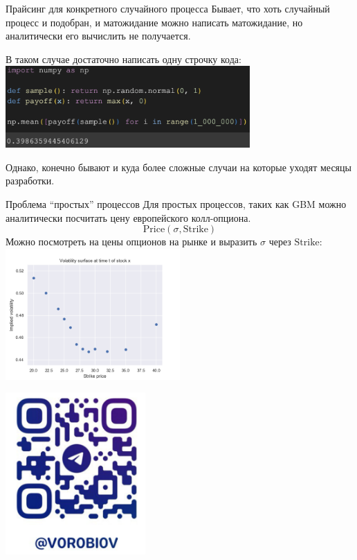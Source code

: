 \documentclass{beamer}
\newcommand{\quotes}[1]{``#1''}
\begin{document}
    \begin{frame}{Прайсинг для конкретного случайного процесса}
        Бывает, что хоть случайный процесс и подобран, и матожидание можно написать матожидание, но аналитически его вычислить не получается.

        В таком случае достаточно написать одну строчку кода:
        \includegraphics[width=0.7\textwidth]{code.png}

        Однако, конечно бывают и куда более сложные случаи на которые уходят месяцы разработки.

    \end{frame}

    \begin{frame}{Проблема \quotes{простых} процессов}
        Для простых процессов, таких как GBM можно аналитически посчитать цену европейского колл-опциона.
        \[
            \mathrm{Price}\left(\sigma, \mathrm{Strike}\right)
        \]
        Можно посмотреть на цены опционов на рынке и выразить $\sigma$ через $\mathrm{Strike}$:\\
        \includegraphics[width=0.5\textwidth]{implied.png}
    \end{frame}

    \begin{frame}
        \center
        \includegraphics[width=0.4\textwidth]{me.png}
    \end{frame}
\end{document}
